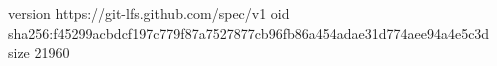 version https://git-lfs.github.com/spec/v1
oid sha256:f45299acbdcf197c779f87a7527877cb96fb86a454adae31d774aee94a4e5c3d
size 21960
